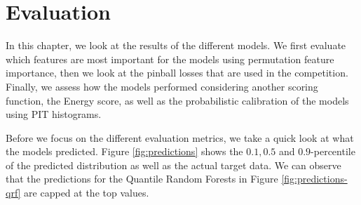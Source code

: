 \chapter{Evaluation}
\label{ch:evaluation}

In this chapter, we look at the results of the different models. 
We first evaluate which features are most important for the models using 
permutation feature importance, then we look at the pinball losses 
that are used in the competition. Finally, we assess how the models performed 
considering another scoring function, the Energy score, as well as the probabilistic calibration 
of the models using PIT histograms.

Before we focus on the different evaluation metrics, 
we take a quick look at what the models predicted. 
Figure \ref{fig:predictions} shows the \(0.1, 0.5\) and \(0.9\)-percentile 
of the predicted distribution as well as the actual target data.
We can observe that the predictions for the Quantile Random Forests in Figure \ref{fig:predictions-qrf} are 
capped at the top values. 

